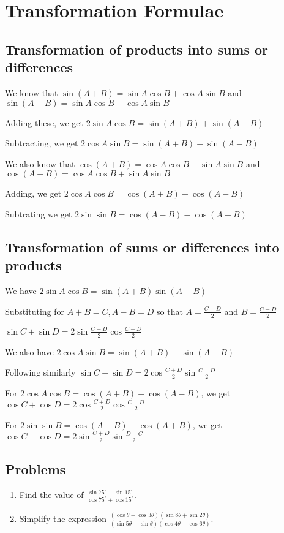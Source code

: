 \chapter{Transformation Formulae}
\section{Transformation of products into sums or differences}
We know that $\sin(A + B) = \sin A\cos B + \cos A\sin B$ and $\sin(A - B) = \sin A\cos B - \cos A\sin B$

\noindent Adding these, we get $2\sin A\cos B = \sin(A + B) + \sin(A - B)$

\noindent Subtracting, we get $2\cos A\sin B = \sin(A + B) - \sin (A - B)$

\noindent We also know that $\cos (A + B) = \cos A\cos B - \sin A\sin B$ and $\cos(A - B) = \cos A\cos B + \sin A\sin B$

\noindent Adding, we get $2\cos A\cos B = \cos (A + B) + \cos(A - B)$

\noindent Subtrating we get $2\sin \sin B = \cos (A - B) - \cos(A + B)$

\section{Transformation of sums or differences into products}
We have $2\sin A\cos B = \sin(A + B)\sin(A - B)$

\noindent Substituting for $A + B = C, A - B = D$ so that $A = \frac{C + D}{2}$ and $B = \frac{C- D}{2}$

\noindent $\sin C + \sin D = 2\sin \frac{C + D}{2}\cos \frac{C - D}{2}$

\noindent We also have $2\cos A\sin B = \sin(A + B) - \sin (A - B)$

\noindent Following similarly $\sin C - \sin D = 2\cos \frac{C + D}{2}\sin \frac{C - D}{2}$

\noindent For $2\cos A\cos B = \cos (A + B) + \cos(A - B)$, we get $\cos C + \cos D = 2\cos \frac{C + D}{2}\cos \frac{C - D}{2}$

\noindent For $2\sin \sin B = \cos (A - B) - \cos(A + B)$, we get $\cos C - \cos D = 2\sin \frac{C + D}{2}\sin \frac{D - C}{2}$

\section{Problems}
\begin{enumerate}
\item Find the value of $\frac{\sin 75^\circ - \sin 15^\circ}{\cos 75^\circ + \cos 15^\circ}$.

\item Simplify the expression $\frac{(\cos \theta - \cos 3\theta)(\sin 8\theta + \sin 2\theta)}{(\sin 5\theta - \sin\theta)(\cos
   4\theta - \cos 6\theta)}$.
\end{enumerate}

